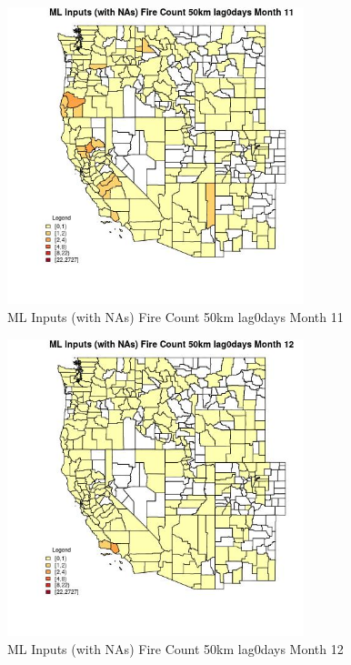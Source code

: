 \begin{figure} 
\centering  
\includegraphics[width=0.77\textwidth]{Code_Outputs/Report_ML_input_PM25_Step4_part_f_de_duplicated_aves_prioritize_24hr_obswNAs_CountyFire_Count_50km_lag0daysmedianMonth11.jpg} 
\caption{\label{fig:Report_ML_input_PM25_Step4_part_f_de_duplicated_aves_prioritize_24hr_obswNAsCountyFire_Count_50km_lag0daysmedianMonth11}ML Inputs (with NAs) Fire Count 50km lag0days Month 11} 
\end{figure} 
 

\begin{figure} 
\centering  
\includegraphics[width=0.77\textwidth]{Code_Outputs/Report_ML_input_PM25_Step4_part_f_de_duplicated_aves_prioritize_24hr_obswNAs_CountyFire_Count_50km_lag0daysmedianMonth12.jpg} 
\caption{\label{fig:Report_ML_input_PM25_Step4_part_f_de_duplicated_aves_prioritize_24hr_obswNAsCountyFire_Count_50km_lag0daysmedianMonth12}ML Inputs (with NAs) Fire Count 50km lag0days Month 12} 
\end{figure} 
 

